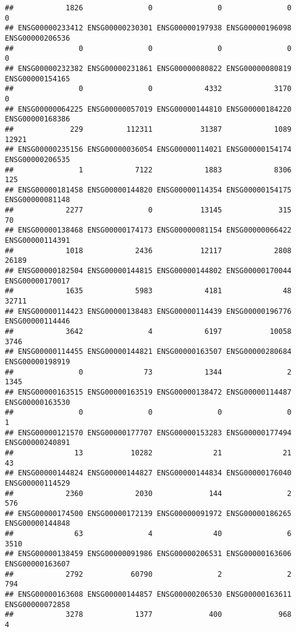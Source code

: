 \documentclass[
]{article}
\begin{document}
\begin{verbatim}
##            1826               0               0               0               0 
## ENSG00000233412 ENSG00000230301 ENSG00000197938 ENSG00000196098 ENSG00000206536 
##               0               0               0               0               0 
## ENSG00000232382 ENSG00000231861 ENSG00000080822 ENSG00000080819 ENSG00000154165 
##               0               0            4332            3170               0 
## ENSG00000064225 ENSG00000057019 ENSG00000144810 ENSG00000184220 ENSG00000168386 
##             229          112311           31387            1089           12921 
## ENSG00000235156 ENSG00000036054 ENSG00000114021 ENSG00000154174 ENSG00000206535 
##               1            7122            1883            8306             125 
## ENSG00000181458 ENSG00000144820 ENSG00000114354 ENSG00000154175 ENSG00000081148 
##            2277               0           13145             315              70 
## ENSG00000138468 ENSG00000174173 ENSG00000081154 ENSG00000066422 ENSG00000114391 
##            1018            2436           12117            2808           26189 
## ENSG00000182504 ENSG00000144815 ENSG00000144802 ENSG00000170044 ENSG00000170017 
##            1635            5983            4181              48           32711 
## ENSG00000114423 ENSG00000138483 ENSG00000114439 ENSG00000196776 ENSG00000114446 
##            3642               4            6197           10058            3746 
## ENSG00000114455 ENSG00000144821 ENSG00000163507 ENSG00000280684 ENSG00000198919 
##               0              73            1344               2            1345 
## ENSG00000163515 ENSG00000163519 ENSG00000138472 ENSG00000114487 ENSG00000163530 
##               0               0               0               0               1 
## ENSG00000121570 ENSG00000177707 ENSG00000153283 ENSG00000177494 ENSG00000240891 
##              13           10282              21              21              43 
## ENSG00000144824 ENSG00000144827 ENSG00000144834 ENSG00000176040 ENSG00000114529 
##            2360            2030             144               2             576 
## ENSG00000174500 ENSG00000172139 ENSG00000091972 ENSG00000186265 ENSG00000144848 
##              63               4              40               6            3510 
## ENSG00000138459 ENSG00000091986 ENSG00000206531 ENSG00000163606 ENSG00000163607 
##            2792           60790               2               2             794 
## ENSG00000163608 ENSG00000144857 ENSG00000206530 ENSG00000163611 ENSG00000072858 
##            3278            1377             400             968               4 

\end{verbatim}
\end{document}
